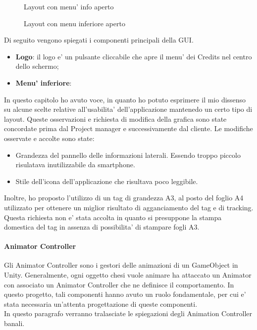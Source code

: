 \begin{figure}[H]
	\centering
	\caption{Layout con menu' info aperto}
	\label{fig:Layout con menu' info aperto}
\end{figure}

\begin{figure}[H]
	\centering
	\caption{Layout con menu inferiore aperto}
	\label{fig:Layout con menu inferiore aperto}
\end{figure}
\newpage
Di seguito vengono spiegati i componenti principali della GUI.

\begin{itemize}
	\item \textbf{Logo}: il logo e' un pulsante cliccabile che apre il menu' dei Credits nel centro dello schermo;
	\item \textbf{Menu' inferiore}:
\end{itemize}

In questo capitolo ho avuto voce, in quanto ho potuto esprimere il mio dissenso su alcune scelte relative all'usabilita' dell'applicazione mantenedo un certo tipo di layout. Queste osservazioni e richiesta di modifica della grafica sono state concordate prima dal Project manager e successivamente dal cliente. Le modifiche osservate e accolte sono state:

\begin{itemize}
	\item Grandezza del pannello delle informazioni laterali. Essendo troppo piccolo risulatava inutilizzabile da smartphone.
	\item Stile dell'icona dell'applicazione che risultava poco leggibile.
\end{itemize}

Inoltre, ho proposto l'utilizzo di un tag di grandezza A3, al posto del foglio A4 utilizzato per ottenere un miglior risultato di agganciamento del tag e di tracking. Questa richiesta non e' stata accolta in quanto si presuppone la stampa domestica del tag in assenza di possibilita' di stampare fogli A3.\\


\paragraph{Animator Controller}
Gli Animator Controller sono i gestori delle animazioni di un GameObject in Unity. Generalmente, ogni oggetto chesi vuole animare ha attaccato un Animator con associato un Animator Controller che ne definisce il comportamento. In questo progetto, tali componenti hanno avuto un ruolo fondamentale, per cui e' stata necessaria un'attenta progettazione di queste componenti.\\
In questo paragrafo verranno tralasciate le spiegazioni degli Animation Controller banali.\\

